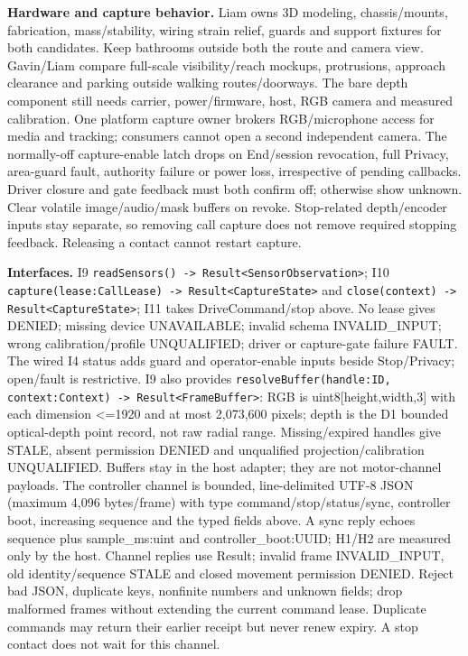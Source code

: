\documentclass[12pt,letterpaper]{article}
\newcommand{\field}[1]{\texttt{#1}}
\begin{document}
\textbf{Hardware and capture behavior.} Liam owns 3D modeling, chassis/mounts, fabrication, mass/stability, wiring strain relief, guards and support fixtures for both candidates. Keep bathrooms outside both the route and camera view. Gavin/Liam compare full-scale visibility/reach mockups, protrusions, approach clearance and parking outside walking routes/doorways. The bare depth component still needs carrier, power/firmware, host, RGB camera and measured calibration. One platform capture owner brokers RGB/microphone access for media and tracking; consumers cannot open a second independent camera. The normally-off capture-enable latch drops on End/session revocation, full Privacy, area-guard fault, authority failure or power loss, irrespective of pending callbacks. Driver closure and gate feedback must both confirm off; otherwise show unknown. Clear volatile image/audio/mask buffers on revoke. Stop-related depth/encoder inputs stay separate, so removing call capture does not remove required stopping feedback. Releasing a contact cannot restart capture.

\textbf{Interfaces.} I9 \field{readSensors() -> Result<SensorObservation>}; I10 \field{capture(lease:CallLease) -> Result<CaptureState>} and \field{close(context) -> Result<CaptureState>}; I11 takes DriveCommand/stop above. No lease gives DENIED; missing device UNAVAILABLE; invalid schema INVALID\_\allowbreak{}INPUT; wrong calibration/profile UNQUALIFIED; driver or capture-gate failure FAULT. The wired I4 status adds guard and operator-enable inputs beside Stop/Privacy; open/fault is restrictive. I9 also provides \field{resolveBuffer(handle:ID, context:Context) -> Result<FrameBuffer>}: RGB is uint8[height,width,3] with each dimension <=1920 and at most 2,073,600 pixels; depth is the D1 bounded optical-depth point record, not raw radial range. Missing/expired handles give STALE, absent permission DENIED and unqualified projection/calibration UNQUALIFIED. Buffers stay in the host adapter; they are not motor-channel payloads. The controller channel is bounded, line-delimited UTF-8 JSON (maximum 4,096 bytes/frame) with type command/stop/status/sync, controller boot, increasing sequence and the typed fields above. A sync reply echoes sequence plus sample\_\allowbreak{}ms:uint and controller\_\allowbreak{}boot:UUID; H1/H2 are measured only by the host. Channel replies use Result; invalid frame INVALID\_\allowbreak{}INPUT, old identity/sequence STALE and closed movement permission DENIED. Reject bad JSON, duplicate keys, nonfinite numbers and unknown fields; drop malformed frames without extending the current command lease. Duplicate commands may return their earlier receipt but never renew expiry. A stop contact does not wait for this channel.
\end{document}
